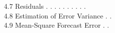 4.7 Residuals . . . . . . . . . . \\
4.8 Estimation of Error Variance . . \\
4.9 Mean-Square Forecast Error . .